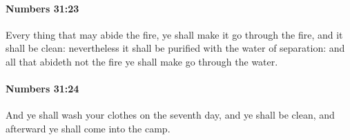 		\paragraph{Numbers 31:23} %
			\label{NUMBERS-31-23}

			Every thing that may abide the fire, ye shall make it go through the fire, and it shall be clean: nevertheless it shall be purified with the water of separation: and all that abideth not the fire ye shall make go through the water.


		\paragraph{Numbers 31:24} %
			\label{NUMBERS-31-24}

			And ye shall wash your clothes on the seventh day, and ye shall be clean, and afterward ye shall come into the camp.


